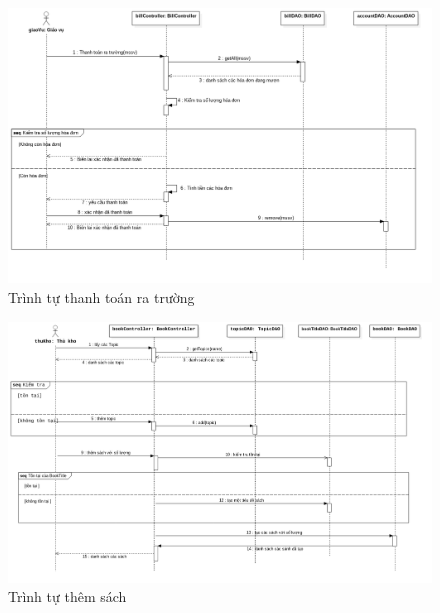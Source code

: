 \documentclass[../report.tex]{subfiles}
\begin{document}
\begin{figure}[H]
\centering
\includegraphics[width=\textwidth]{figures/thanhtoanratruongseq.png}
\caption{Trình tự thanh toán ra trường}
\end{figure}

\begin{figure}[H]
\centering
\includegraphics[width=\textwidth]{figures/themTLseq.png}
\caption{Trình tự thêm sách}
\end{figure}

\end{document}
